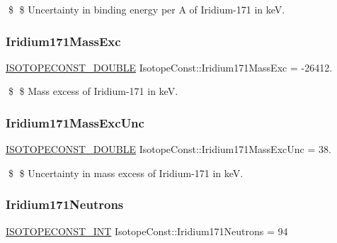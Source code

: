 \$ \$ Uncertainty in binding energy per A of Iridium-\/171 in keV. \mbox{\label{group___isotope_const-_iridium-_ir171_gae92d8dc0302f6e004f631242b3328bfb}} 
\subsubsection{\texorpdfstring{Iridium171\+Mass\+Exc}{Iridium171MassExc}}
{\footnotesize\ttfamily \mbox{\hyperlink{group___isotope_const-_macros_ga8f45a7272ce02c0b4c65c44636ed719a}{I\+S\+O\+T\+O\+P\+E\+C\+O\+N\+S\+T\+\_\+\+D\+O\+U\+B\+LE}} Isotope\+Const\+::\+Iridium171\+Mass\+Exc = -\/26412.}

\$ \$ Mass excess of Iridium-\/171 in keV. \mbox{\label{group___isotope_const-_iridium-_ir171_ga61f6e1a6bbd3176316b623184312b566}} 
\subsubsection{\texorpdfstring{Iridium171\+Mass\+Exc\+Unc}{Iridium171MassExcUnc}}
{\footnotesize\ttfamily \mbox{\hyperlink{group___isotope_const-_macros_ga8f45a7272ce02c0b4c65c44636ed719a}{I\+S\+O\+T\+O\+P\+E\+C\+O\+N\+S\+T\+\_\+\+D\+O\+U\+B\+LE}} Isotope\+Const\+::\+Iridium171\+Mass\+Exc\+Unc = 38.}

\$ \$ Uncertainty in mass excess of Iridium-\/171 in keV. \mbox{\label{group___isotope_const-_iridium-_ir171_ga8e6a4359094a00c519c841e527fa8cfc}} 
\subsubsection{\texorpdfstring{Iridium171\+Neutrons}{Iridium171Neutrons}}
{\footnotesize\ttfamily \mbox{\hyperlink{group___isotope_const-_macros_ga5f18360b3e99483a35c32d789e62621c}{I\+S\+O\+T\+O\+P\+E\+C\+O\+N\+S\+T\+\_\+\+I\+NT}} Isotope\+Const\+::\+Iridium171\+Neutrons = 94}

